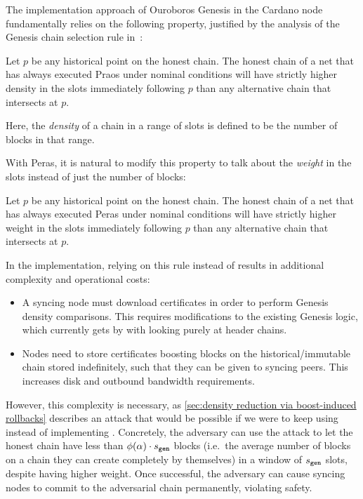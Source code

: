 The implementation approach of Ouroboros Genesis in the Cardano node fundamentally relies on the following property, justified by the analysis of the Genesis chain selection rule in~\cite{badertscher2018ouroboros}:
\begin{tcolorbox}[title=\densityOfCompetingChainsName]\label{property:density-of-competing-chains}
  Let $p$ be any historical point on the honest chain. The honest chain of a net that has always executed Praos under nominal conditions will have strictly higher density in the \sgen{} slots immediately following $p$ than any alternative chain that intersects at $p$.
\end{tcolorbox}
Here, the \emph{density} of a chain in a range of slots is defined to be the number of blocks in that range.

\medskip
With Peras, it is natural to modify this property to talk about the \emph{weight} in the \sgen{} slots instead of just the number of blocks:
\begin{tcolorbox}[title=\weightedDensityOfCompetingChainsName]\label{property:weighted-density-of-competing-chains}
  Let $p$ be any historical point on the honest chain. The honest chain of a net that has always executed Peras under nominal conditions will have strictly higher weight in the \sgen{} slots immediately following $p$ than any alternative chain that intersects at $p$.
\end{tcolorbox}
In the implementation, relying on this rule instead of \densityOfCompetingChains{} results in additional complexity and operational costs:
\begin{itemize}
\item A syncing node must download certificates in order to perform Genesis density comparisons.
  This requires modifications to the existing Genesis logic, which currently gets by with looking purely at header chains.
\item Nodes need to store certificates boosting blocks on the historical/immutable chain stored indefinitely, such that they can be given to syncing peers.
  This increases disk and outbound bandwidth requirements.
\end{itemize}
However, this complexity is necessary, as \cref{sec:density reduction via boost-induced rollbacks} describes an attack that would be possible if we were to keep using \densityOfCompetingChains{} instead of implementing \weightedDensityOfCompetingChains{}.
Concretely, the adversary can use the attack to let the honest chain have less than $\phi(\alpha) \cdot s_{\mathtt{gen}}$ blocks (i.e.\ the average number of blocks on a chain they can create completely by themselves) in a window of $s_{\mathtt{gen}}$ slots, despite having higher weight.
Once successful, the adversary can cause syncing nodes to commit to the adversarial chain permanently, violating safety.

